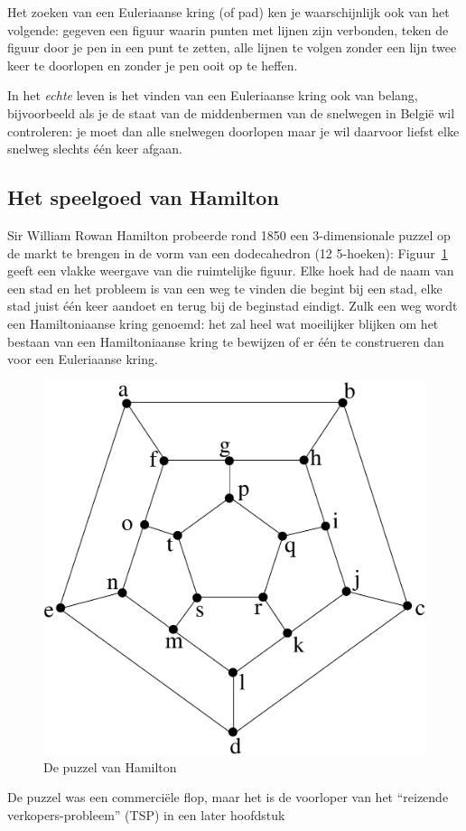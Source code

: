 Het zoeken van een Euleriaanse kring (of pad) ken je waarschijnlijk
ook van het volgende: gegeven een figuur waarin punten met lijnen
zijn verbonden, teken de figuur door je pen in een punt te
zetten, alle lijnen te volgen zonder een lijn twee keer te
doorlopen en zonder je pen ooit op te heffen.

In het {\em echte} leven is het vinden van een Euleriaanse kring ook
van belang, bijvoorbeeld als je de staat van de middenbermen van de
snelwegen in Belgi\"{e} wil controleren: je moet dan alle snelwegen
doorlopen maar je wil daarvoor liefst elke snelweg slechts \'{e}\'{e}n
keer afgaan.

\subsection{Het speelgoed van Hamilton}

Sir William Rowan Hamilton probeerde rond 1850 een
3-dimensionale puzzel op de markt te brengen in de vorm van een
dodecahedron (12 5-hoeken): Figuur~\ref{hamilton1} geeft een vlakke
weergave van die ruimtelijke figuur.  Elke hoek had de naam van een
stad en het probleem is van een weg te vinden die begint bij een stad,
elke stad juist \'{e}\'{e}n keer aandoet en terug bij de beginstad eindigt.
Zulk een weg wordt een Hamiltoniaanse kring genoemd: het zal heel
wat moeilijker blijken om het bestaan van een Hamiltoniaanse kring te
bewijzen of er \'{e}\'{e}n te construeren dan voor een Euleriaanse kring.

\begin{figure}[ht]
\begin{center}
\includegraphics[width=0.4\linewidth,keepaspectratio]{hamilton}
\end{center}
\caption{De puzzel van Hamilton
\label{hamilton1}}
\end{figure}

De puzzel was een commerci\"{e}le flop, maar het is de voorloper van
het ``reizende verkopers-probleem'' (TSP) in een later hoofdstuk

